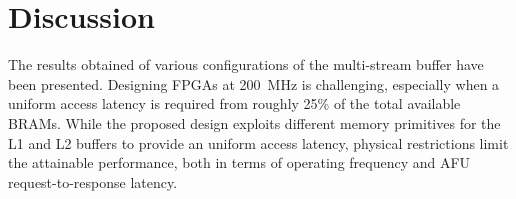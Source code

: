 



\section{Discussion}
The results obtained of various configurations of the multi-stream buffer have been presented. Designing FPGAs at \SI{200}{\mega\hertz} is challenging, especially when a uniform access latency is required from roughly 25\% of the total available BRAMs. While the proposed design exploits different memory primitives for the L1 and L2 buffers to provide an uniform access latency, physical restrictions limit the attainable performance, both in terms of operating frequency and AFU request-to-response latency.

